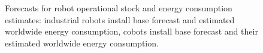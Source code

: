 \begin{figure}[!t]
	\hfill    
	\hspace*{\fill}    
	\caption[] {\label{fig:robot_forecasts} Forecasts for robot operational stock and energy consumption estimates:  industrial robots install base forecast and  estimated worldwide energy consumption,  cobots install base forecast and their  estimated worldwide energy consumption.}
\end{figure}

